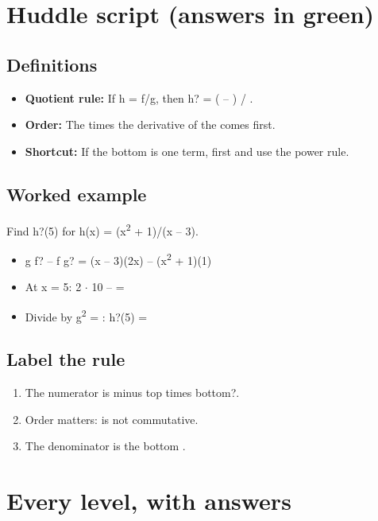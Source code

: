 \documentclass[11pt]{article}
\begin{document}
\section*{Huddle script (answers in green)}
\subsection*{Definitions}\begin{itemize}
\item \textbf{Quotient rule:} If h = f/g, then h? = ( -- ) / .
\item \textbf{Order:} The  times the derivative of the  comes first.
\item \textbf{Shortcut:} If the bottom is one term,  first and use the power rule.
\end{itemize}
\subsection*{Worked example}
Find h?(5) for h(x) = (x\textsuperscript{2} + 1)/(x -- 3).\\
\begin{itemize}
\item g f? -- f g? = (x -- 3)(2x) -- (x\textsuperscript{2} + 1)(1)
\item At x = 5: 2 $\cdot$ 10 --  = 
\item Divide by g\textsuperscript{2} = : h?(5) = 
\end{itemize}
\subsection*{Label the rule}
\begin{enumerate}
\item The numerator is  minus top times bottom?.
\item Order matters:  is not commutative.
\item The denominator is the bottom .
\end{enumerate}
\section*{Every level, with answers}
\end{document}
